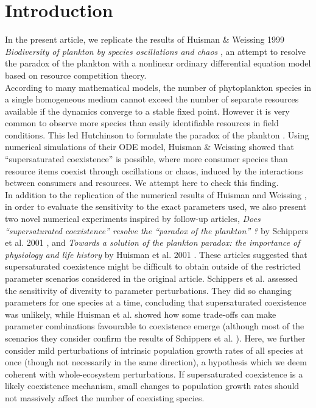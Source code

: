\section{Introduction}
In the present article, we replicate the results of Huisman \& Weissing 1999 \textit{Biodiversity of plankton by species oscillations and chaos} \cite{1999:Huisman}, an attempt to resolve the paradox of the plankton \cite{1961:Hutchinson} with a nonlinear ordinary differential equation model based on resource competition theory.\\

According to many mathematical models, the number of phytoplankton species in a single homogeneous medium cannot exceed the number of separate resources available \cite{1960:Hardin,1973:Phillips,1980:Armstrong} if the dynamics converge to a stable fixed point. However it is very common to observe more species than easily identifiable resources in field conditions. This led Hutchinson to formulate the paradox of the plankton \cite{1961:Hutchinson}. Using numerical simulations of their ODE model, Huisman \& Weissing \cite{1999:Huisman} showed that ``supersaturated coexistence'' is possible, where more consumer species than resource items coexist through oscillations or chaos, induced by the interactions between consumers and resources. We attempt here to check this finding. \\

In addition to the replication of the numerical results of Huisman and Weissing \cite{1999:Huisman}, in order to evaluate the sensitivity to the exact parameters used, we also present two novel numerical experiments inspired by follow-up articles, \textit{Does ``supersaturated coexistence'' resolve the ``paradox of the plankton'' ?} by Schippers et al. 2001 \cite{2001:Schippers}, and \textit{Towards a solution of the plankton paradox: the importance of physiology and life history} by Huisman et al. 2001 \cite{2001:Huisman}. These articles suggested that supersaturated coexistence might be difficult to obtain outside of the restricted parameter scenarios considered in the original article. Schippers et al. \cite{2001:Schippers} assessed the sensitivity of diversity to parameter perturbations. They did so changing parameters for one species at a time, concluding that supersaturated coexistence was unlikely, while Huisman et al. \cite{2001:Huisman} showed how some trade-offs can make parameter combinations favourable to coexistence emerge (although most of the scenarios they consider confirm the results of Schippers et al. \cite{2001:Schippers}). Here, we further consider mild perturbations of intrinsic population growth rates of all species at once (though not necessarily in the same direction), a hypothesis which we deem coherent with whole-ecosystem perturbations. If supersaturated coexistence is a likely coexistence mechanism, small changes to population growth rates should not massively affect the number of coexisting species. 

